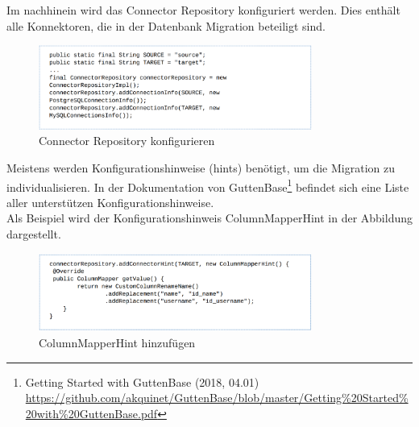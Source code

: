	Im nachhinein wird das Connector Repository konfiguriert werden. Dies enthält alle Konnektoren, die in der Datenbank Migration beteiligt sind. \\
	\begin{figure}[H]
		\centering
		\includegraphics[width=0.8\textwidth]{images/gb/repo}
		\caption{Connector Repository konfigurieren}
		\label{img:gb/repo}
	\end{figure}
	
	Meistens werden Konfigurationshinweise (hints) benötigt, um die Migration zu individualisieren. In der Dokumentation von GuttenBase\footnote{Getting Started with GuttenBase (2018, 04.01) \\ \url{https://github.com/akquinet/GuttenBase/blob/master/Getting\%20Started\%20with\%20GuttenBase.pdf}} befindet sich eine Liste aller unterstützen Konfigurationshinweise. \\
	Als Beispiel wird der Konfigurationshinweis ColumnMapperHint in der Abbildung dargestellt.
	\begin{figure}[H]
		\centering
		\includegraphics[width=0.8\textwidth]{images/gb/rename}
		\caption{ColumnMapperHint hinzufügen}
		\label{img:gb/rename}
	\end{figure}
	

